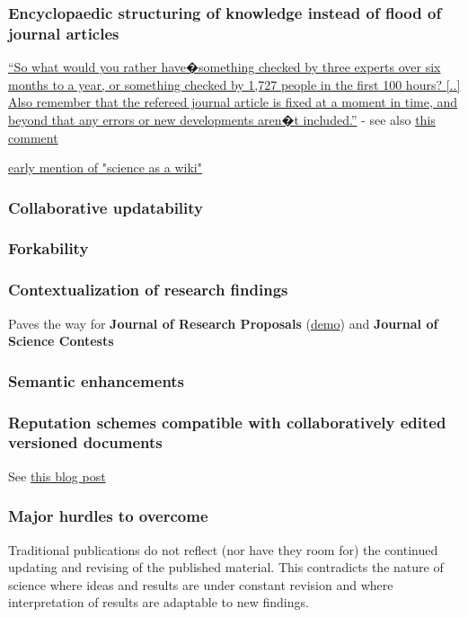 \documentclass[final,authoryear,3p]{elsarticle-open-drafting}
\begin{document}
\subsubsection{Encyclopaedic structuring of knowledge instead of flood of journal articles}
\href{http://nextbison.wordpress.com/2011/05/18/should-you-believe-wikipedia/}{``So what would you rather have�something checked by three experts over six months to a year, or something checked by 1,727 people in the first 100 hours?  [..]  Also remember that the refereed journal article is fixed at a moment in time, and beyond that any errors or new developments aren�t included.''} - see also \href{http://nextbison.wordpress.com/2011/05/18/should-you-believe-wikipedia/#comment-486}{this comment}

\href{http://opencontract.org/}{early mention of "science as a wiki"}

\subsubsection{Collaborative updatability}
\subsubsection{Forkability}
\subsubsection{Contextualization of research findings}
Paves the way for {\bf Journal of Research Proposals} (\href{http://iphylo.blogspot.com/2011/06/would-you-give-me-grant-experiment-in.html}{demo}) and {\bf Journal of Science Contests}

\subsubsection{Semantic enhancements}
\subsubsection{Reputation schemes compatible with collaboratively edited versioned documents}
See \href{http://www.science3point0.com/evomri/2011/04/16/citing-versioned-papers-robots-and-reviewers/}{this blog post}

\subsubsection{Major hurdles to overcome}
Traditional publications do not reflect (nor have they room for) the continued updating and revising of the published material. This contradicts the nature of science where ideas and results are under constant revision and where interpretation of results are adaptable to new findings. 
\end{document}
